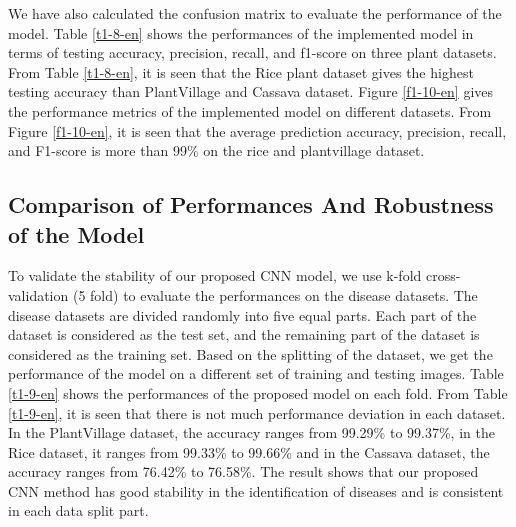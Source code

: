

We have also calculated the confusion matrix to evaluate the performance of the model. Table \ref{t1-8-en} shows the performances of the implemented model in terms of testing accuracy, precision, recall, and f1-score on three plant datasets. From Table \ref{t1-8-en}, it is seen that the Rice plant dataset gives the highest testing accuracy than PlantVillage and Cassava dataset. Figure \ref{f1-10-en} gives the performance metrics of the implemented model on different datasets. From Figure \ref{f1-10-en}, it is seen that the average prediction accuracy, precision, recall, and F1-score is more than 99\% on the rice and plantvillage dataset.



\subsection{Comparison of Performances And Robustness of the Model}
To validate the stability of our proposed CNN model, we use k-fold cross-validation (5 fold) to evaluate the performances on the disease datasets. The disease datasets are divided randomly into five equal parts. Each part of the dataset is considered as the test set, and the remaining part of the dataset is considered as the training set. Based on the splitting of the dataset, we get the performance of the model on a different set of training and testing images. Table \ref{t1-9-en} shows the performances of the proposed model on each fold. From Table \ref{t1-9-en}, it is seen that there is not much performance deviation in each dataset. In the PlantVillage dataset, the accuracy ranges from 99.29\% to 99.37\%, in the Rice dataset, it ranges from 99.33\% to 99.66\% and in the Cassava dataset, the accuracy ranges from 76.42\% to 76.58\%. The result shows that our proposed CNN method has good stability in the identification of diseases and is consistent in each data split part.


